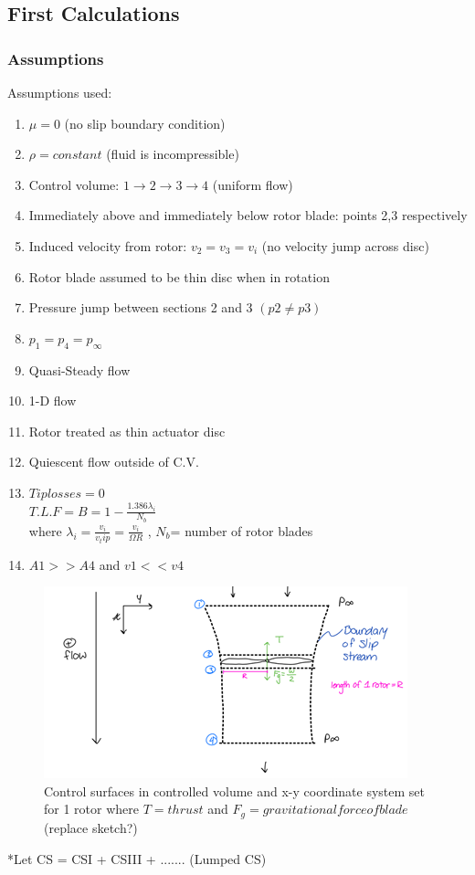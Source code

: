 
\subsection*{First Calculations}
\subsubsection*{Assumptions}
Assumptions used:

\begin{enumerate}[label=\roman*.]
\item$\mu = 0$ (no slip boundary condition)
\item$\rho =constant$ (fluid is incompressible)
\item Control volume: $1\rightarrow 2\rightarrow3\rightarrow 4$ (uniform flow)
\item Immediately above and immediately below rotor blade: points 2,3 respectively
\item Induced velocity from rotor: $v_2=v_3=v_i$ (no velocity jump across disc)
\item Rotor blade assumed to be thin disc when in rotation
\item Pressure jump between sections 2 and 3 $(p2 \neq p3)$
\item $p_1=p_4=p_\infty$
\item Quasi-Steady flow
\item 1-D flow
\item Rotor treated as thin actuator disc
\item Quiescent flow outside of C.V.
\item $ Tip losses=0$   \\ 
 $\displaystyle{T.L.F=B=1-\frac{1.386\lambda_i}{N_b}}$   \\
 where $\displaystyle{\lambda_i=\frac{v_i}{v_tip}=\frac{v_i}{\Omega R}}$ , $N_b$= number of rotor blades
\item $A1>>A4$ and $v1<<v4$
\end{enumerate}

\begin{figure}[h!]
\begin{center}
  \includegraphics[scale=1]{Pictures/part1_fig1.png}
  \caption{Control surfaces in controlled volume and x-y coordinate system set for 1 rotor where $T = thrust$ and $F_g= gravitational force of blade$ (replace sketch?)}
    \label{fig:part1_fig1}
\end{center}
\end{figure}
\FloatBarrier
*Let CS = CSI + CSIII + ....... (Lumped CS)

